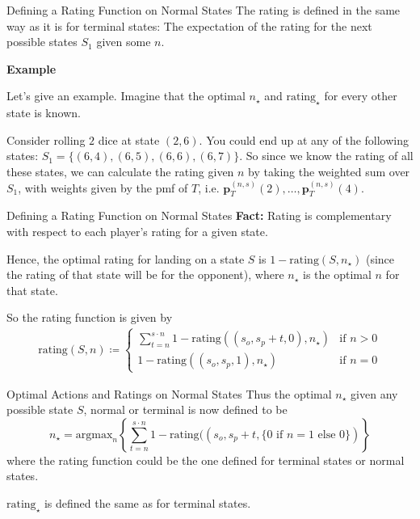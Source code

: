 \documentclass{beamer}
\begin{document}
\begin{frame}{Defining a Rating Function on Normal States}
    The rating is defined in the same way as it is for terminal states: The expectation of the rating for the next possible states $S_1$ given some $n$.

    \textbf{Example}

    Let's give an example. Imagine that the optimal $n_{\star}$ and $\text{rating}_{\star}$ for every other state is known.

    Consider rolling $2$ dice at state $(2, 6)$. You could end up at any of the following states: $S_1 = \{(6, 4), (6,5), (6,6), (6,7)\}$. So since we know the rating of all these states, we can calculate the rating given $n$ by taking the weighted sum over $S_1$, with weights given by the pmf of $T$, i.e. $\textbf{p}_{T}^{(n, s)}(2), \ldots, \textbf{p}_{T}^{(n, s)}(4)$.
\end{frame}

\begin{frame}{Defining a Rating Function on Normal States}
    \textbf{Fact:} Rating is complementary with respect to each player's rating for a given state.

    Hence, the optimal rating for landing on a state $S$ is $1-\text{rating}(S, n_{\star})$ (since the rating of that state will be for the opponent), where $n_{\star}$ is the optimal $n$ for that state.


    So the rating function is given by
    \begin{align*}
        \text{rating}(S, n) \coloneqq \begin{cases}
            \sum_{t = n}^{s \cdot n} 1 - \text{rating}((s_o, s_p + t, 0), n_{\star}) & \text{if } n > 0 \\
            1- \text{rating}((s_o, s_p, 1), n_{\star}) & \text{if } n = 0
        \end{cases}
    \end{align*}
\end{frame}

\begin{frame}{Optimal Actions and Ratings on Normal States}
    Thus the optimal $n_{\star}$ given any possible state $S$, normal or terminal is now defined to be
    $$
    n_{\star} = \text{argmax}_{n} \left\{\sum_{t = n}^{s \cdot n} 1 - \text{rating}((s_o, s_p + t, \{0 \text{ if } n = 1 \text{ else } 0\}) \right\}
    $$
    where the rating function could be the one defined for terminal states or normal states.

    $\text{rating}_{\star}$ is defined the same as for terminal states.
\end{frame}
\end{document}
